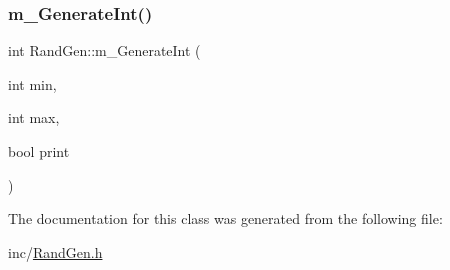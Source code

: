 \mbox{\label{class_rand_gen_a5d786a628d29d51aae40a9df78c1f928}} 
\subsubsection{\texorpdfstring{m\+\_\+\+Generate\+Int()}{m\_GenerateInt()}\hspace{0.1cm}{\footnotesize\ttfamily [2/2]}}
{\footnotesize\ttfamily int Rand\+Gen\+::m\+\_\+\+Generate\+Int (\begin{DoxyParamCaption}\item[{int}]{min,  }\item[{int}]{max,  }\item[{bool}]{print }\end{DoxyParamCaption})}



The documentation for this class was generated from the following file\+:\begin{DoxyCompactItemize}
\item 
inc/\mbox{\hyperlink{_rand_gen_8h}{Rand\+Gen.\+h}}\end{DoxyCompactItemize}
